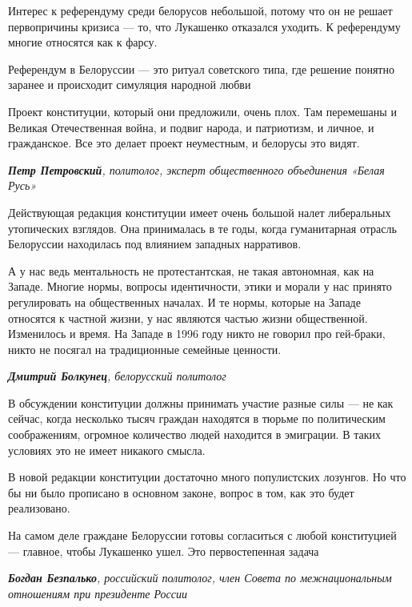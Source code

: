 Интерес к референдуму среди белорусов небольшой, потому что он не решает первопричины кризиса — то, что Лукашенко отказался уходить. К референдуму многие относятся как к фарсу.

\begin{fancyquotes}
    Референдум в Белоруссии — это ритуал советского типа, где решение понятно заранее и происходит симуляция народной любви
\end{fancyquotes}

Проект конституции, который они предложили, очень плох. Там перемешаны и Великая Отечественная война, и подвиг народа, и патриотизм, и личное, и гражданское. Все это делает проект неуместным, и белорусы это видят.

\textit{\textbf{Петр Петровский}, политолог, эксперт общественного объединения «Белая Русь»}

Действующая редакция конституции имеет очень большой налет либеральных утопических взглядов. Она принималась в те годы, когда гуманитарная отрасль Белоруссии находилась под влиянием западных нарративов.

А у нас ведь ментальность не протестантская, не такая автономная, как на Западе. Многие нормы, вопросы идентичности, этики и морали у нас принято регулировать на общественных началах. И те нормы, которые на Западе относятся к частной жизни, у нас являются частью жизни общественной. Изменилось и время. На Западе в 1996 году никто не говорил про гей-браки, никто не посягал на традиционные семейные ценности.

\textit{\textbf{Дмитрий Болкунец}, белорусский политолог}

В обсуждении конституции должны принимать участие разные силы — не как сейчас, когда несколько тысяч граждан находятся в тюрьме по политическим соображениям, огромное количество людей находится в эмиграции. В таких условиях это не имеет никакого смысла.

В новой редакции конституции достаточно много популистских лозунгов. Но что бы ни было прописано в основном законе, вопрос в том, как это будет реализовано.

\begin{fancyquotes}
    На самом деле граждане Белоруссии готовы согласиться с любой конституцией — главное, чтобы Лукашенко ушел. Это первостепенная задача
\end{fancyquotes}

\textit{\textbf{Богдан Безпалько}, российский политолог, член Совета по межнациональным отношениям при президенте России}

